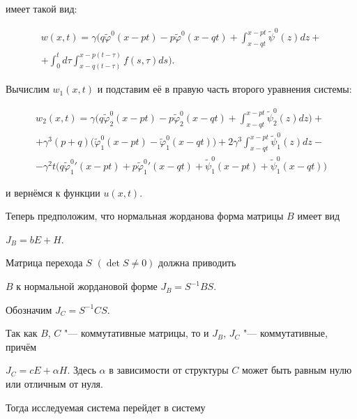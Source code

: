 имеет такой	 вид:

\begin{multline*}

w(x,t)=\gamma\biggl(q\tilde{\varphi}^0(x-pt)-p\tilde{\varphi}^0(x-qt)+\int\nolimits_{x-qt}^{x-pt}{\tilde{\psi}^0(z)dz}+\\

+\int\nolimits_0^t d\tau\int\nolimits_{x-q(t-\tau)}^{x-p(t-\tau)}f(s,\tau)ds\biggr).

\end{multline*}

Вычислим $w_1(x,t)$ и подставим её в правую часть второго уравнения системы:

\begin{multline*}

w_2(x,t)=\gamma\biggl(q\tilde{\varphi}_2^0(x-pt)-p\tilde{\varphi}_2^0(x-qt)+\int\nolimits_{x-qt}^{x-pt}{\tilde{\psi}_2^0(z)dz}\biggr)+\\

+

{\gamma^{3}}(p+q)\bigl( \tilde{\varphi}_1^0(x-pt)-\tilde{\varphi}_1^0(x-qt) \bigr)

+2{\gamma^{3}}\int\nolimits_{x-qt}^{x-pt}{\tilde{\psi}_1^0(z)dz}-\\

-{\gamma^{2}}t\bigl(q{\tilde{\varphi}_1^0}{'}(x-pt)+p{\tilde{\varphi}_1^0}{'}(x-qt)+

\tilde{\psi}_1^0(x-pt)+\tilde{\psi}_1^0(x-qt)

\bigr)

\end{multline*}

и вернёмся к функции $u(x,t)$. \smallskip



Теперь предположим, что нормальная жорданова форма матрицы $B$ имеет вид

$J_B=bE+H$.

Матрица перехода $S$ $(\det S\neq0)$ должна приводить

$B$ к нормальной жордановой форме $J_B=S^{-1}BS$.

Обозначим $J_C=S^{-1}CS$.

Так как $B$, $C$ "--- коммутативные матрицы, то и $J_B$,  $J_C$ "--- коммутативные, причём~\cite{kozlova:bib:Gantmaher}

 $J_C=cE+\alpha H$. Здесь $\alpha$ в зависимости от структуры $C$ может быть равным нулю или отличным от нуля.



Тогда исследуемая система перейдет в систему

